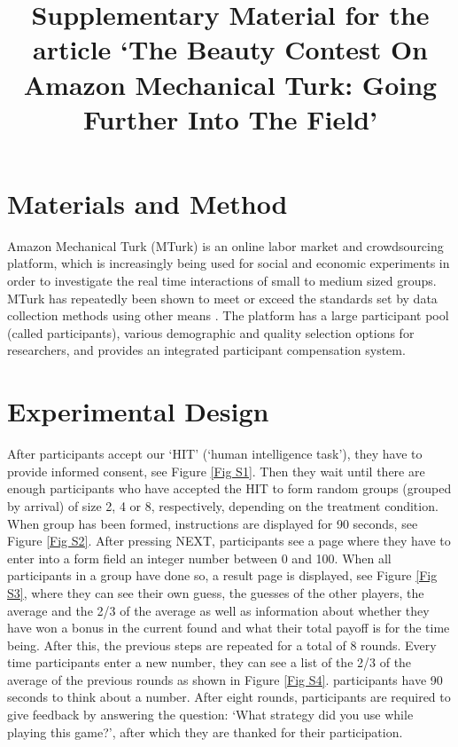 \title{Supplementary Material for the article `The Beauty Contest On Amazon Mechanical Turk: Going Further Into The Field'}

\section{Materials and Method}
Amazon Mechanical Turk (MTurk) is an online labor market and crowdsourcing platform, which is increasingly being used for social and economic experiments in order to investigate the real time interactions of small to medium sized groups. MTurk has repeatedly been shown to meet or exceed the standards set by data collection methods using other means \citep{berinsky_huber_lenz_2012, BuhrmesterEtAl18}. The platform has a large participant pool (called participants), various demographic and quality selection options for researchers, and provides an integrated participant compensation system.

\section{Experimental Design}
After participants accept our ‘HIT’ (‘human intelligence task’), they have to provide informed consent, see Figure \ref{Fig S1}. Then they wait until there are enough participants who have accepted the HIT to form random groups (grouped by arrival) of size 2, 4 or 8, respectively, depending on the treatment condition. When group has been formed, instructions are displayed for 90 seconds, see Figure \ref{Fig S2}. After pressing NEXT, participants see a page where they have to enter into a form field an integer number between 0 and 100. When all participants in a group have done so, a result page is displayed, see Figure \ref{Fig S3}, where they can see their own guess, the guesses of the other players, the average and the 2/3 of the average as well as information about whether they have won a bonus in the current found and what their total payoff is for the time being. After this, the previous steps are repeated for a total of 8 rounds. Every time participants enter a new number, they can see a list of the 2/3 of the average of the previous rounds as shown in Figure \ref{Fig S4}. participants have 90 seconds to think about a number. After eight rounds, participants are required to give feedback by answering the question: ‘What strategy did you use while playing this game?’, after which they are thanked for their participation.


